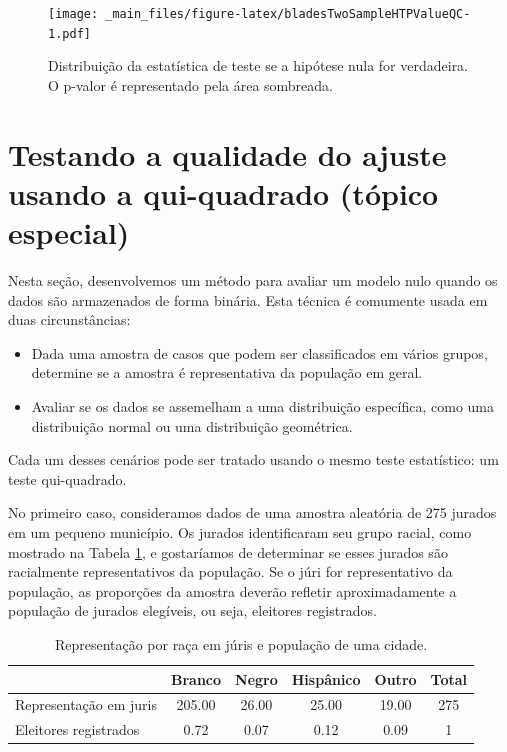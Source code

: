 \documentclass[
]{book}
\theoremstyle{definition}
\theoremstyle{definition}
\theoremstyle{definition}
\theoremstyle{definition}
\theoremstyle{remark}
\begin{document}
\begin{figure}
\centering
\texttt{[image: \_main\_files/figure-latex/bladesTwoSampleHTPValueQC-1.pdf]}
\caption{\label{fig:bladesTwoSampleHTPValueQC}Distribuição da estatística de teste se a hipótese nula for verdadeira. O p-valor é representado pela área sombreada.}
\end{figure}

\hypertarget{testingQualityFitChiSquare}{%
\section{Testando a qualidade do ajuste usando a qui-quadrado (tópico especial)}\label{testingQualityFitChiSquare}}

Nesta seção, desenvolvemos um método para avaliar um modelo nulo quando os dados são armazenados de forma binária. Esta técnica é comumente usada em duas circunstâncias:

\begin{itemize}
\item
  Dada uma amostra de casos que podem ser classificados em vários grupos, determine se a amostra é representativa da população em geral.
\item
  Avaliar se os dados se assemelham a uma distribuição específica, como uma distribuição normal ou uma distribuição geométrica.
\end{itemize}

Cada um desses cenários pode ser tratado usando o mesmo teste estatístico: um teste qui-quadrado.

No primeiro caso, consideramos dados de uma amostra aleatória de 275 jurados em um pequeno município. Os jurados identificaram seu grupo racial, como mostrado na Tabela \ref{tab:juryRepresentationAndCityRepresentationForRace}, e gostaríamos de determinar se esses jurados são racialmente representativos da população. Se o júri for representativo da população, as proporções da amostra deverão refletir aproximadamente a população de jurados elegíveis, ou seja, eleitores registrados.

\begin{table}

\caption{\label{tab:juryRepresentationAndCityRepresentationForRace}Representação por raça em júris e população de uma cidade.}
\centering
\begin{tabular}[t]{l|c|c|c|c|c}
\hline
  & Branco & Negro & Hispânico & Outro & Total\\
\hline
Representação em juris & 205.00 & 26.00 & 25.00 & 19.00 & 275\\
\hline
Eleitores registrados & 0.72 & 0.07 & 0.12 & 0.09 & 1\\
\hline
\end{tabular}
\end{table}
\end{document}
